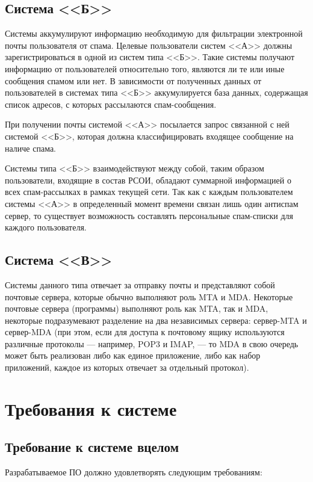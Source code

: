 \subsection{Система <<Б>>}
Системы аккумулируют информацию необходимую для фильтрации электронной почты пользователя от спама. Целевые пользователи систем <<А>> должны зарегистрироваться в одной из систем типа <<Б>>. Такие системы получают информацию от пользователей относительно того, являются ли те или иные сообщения спамом или нет. В зависимости от полученных данных от пользователей в системах типа <<Б>> аккумулируется база данных, содержащая список адресов, с которых рассылаются спам-сообщения.

При получении почты системой <<А>> посылается запрос связанной с ней системой <<Б>>, которая должна классифицировать входящее сообщение на наличе спама.

Системы типа <<Б>> взаимодействуют между собой, таким образом пользователи, входящие в состав РСОИ, обладают суммарной информацией о всех спам-рассылках в рамках текущей сети. Так как с каждым пользователем системы <<А>>  в определенный момент времени связан лишь один антиспам сервер, то существует возможность составлять персональные спам-списки для каждого пользователя. 


\subsection{Система <<В>>}
 Системы данного типа отвечает за отправку почты и представляют собой почтовые сервера, которые обычно выполняют роль MTA и MDA. Некоторые почтовые сервера (программы) выполняют роль как MTA, так и MDA, некоторые подразумевают разделение на два независимых сервера: сервер-MTA и сервер-MDA (при этом, если для доступа к почтовому ящику используются различные протоколы — например, POP3 и IMAP, — то MDA в свою очередь может быть реализован либо как единое приложение, либо как набор приложений, каждое из которых отвечает за отдельный протокол).

 \section{Требования к системе}
 \subsection{Требование к системе вцелом}

 Разрабатываемое ПО должно удовлетворять следующим требованиям:

